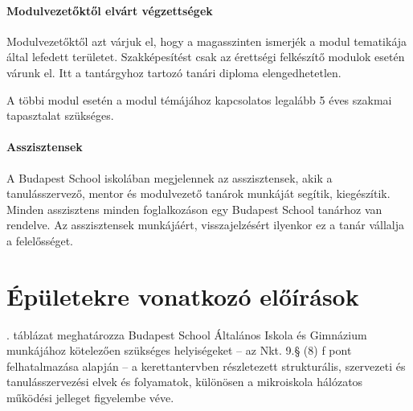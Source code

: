 \paragraph{Modulvezetőktől elvárt végzettségek}
Modulvezetőktől azt várjuk el, hogy a magasszinten ismerjék a modul tematikája által lefedett területet. Szakképesítést csak az érettségi felkészítő modulok esetén várunk el. Itt a tantárgyhoz tartozó tanári diploma elengedhetetlen.

A többi modul esetén a modul témájához kapcsolatos legalább 5 éves szakmai tapasztalat szükséges.

\paragraph{Asszisztensek}
A Budapest School iskolában megjelennek az asszisztensek, akik a tanulásszervező, mentor és modulvezető tanárok munkáját segítik, kiegészítik. Minden asszisztens minden foglalkozáson egy Budapest School tanárhoz van rendelve. Az asszisztensek munkájáért, visszajelzésért ilyenkor ez a tanár vállalja a felelősséget.


\section{Épületekre vonatkozó előírások}
. táblázat meghatározza Budapest School Általános Iskola és Gimnázium munkájához kötelezően szükséges helyiségeket -- az Nkt. 9.§ (8) f pont felhatalmazása alapján -- a kerettantervben részletezett strukturális, szervezeti és tanulásszervezési elvek és folyamatok, különösen a mikroiskola hálózatos működési jelleget figyelembe véve.



